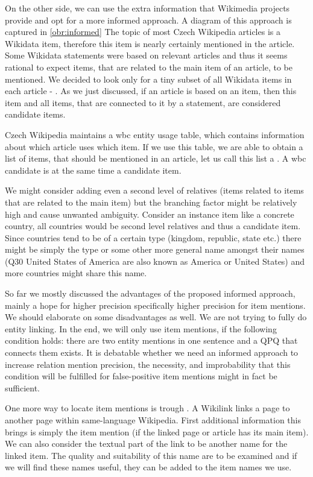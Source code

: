 On the other side, we can use the extra information that Wikimedia projects provide and opt for a more informed approach. A diagram of this approach is captured in \ref{obr:informed} The topic of most Czech Wikipedia articles is a Wikidata item, therefore this item is nearly certainly mentioned in the article. Some Wikidata statements were based on relevant articles and thus it seems rational to expect items, that are related to the main item of an article, to be mentioned. We decided to look only for a tiny subset of all Wikidata items in each article - . As we just discussed, if an article is based on an item, then this item and all items, that are connected to it by a statement, are considered candidate items.

Czech Wikipedia maintains a wbc entity usage table, which contains information about which article uses which item. If we use this table, we are able to obtain a list of items, that should be mentioned in an article, let us call this list a . A wbc candidate is at the same time a candidate item.

We might consider adding even a second level of relatives (items related to items that are related to the main item) but the branching factor might be relatively high and cause unwanted ambiguity. Consider an instance item like a concrete country, all countries would be second level relatives and thus a candidate item. Since countries tend to be of a certain type (kingdom, republic, state etc.) there might be simply the type or some other more general name amongst their names (Q30 United States of America are also known as America or United States) and more countries might share this name.

So far we mostly discussed the advantages of the proposed informed approach, mainly a hope for higher precision specifically higher precision for item mentions. We should elaborate on some disadvantages as well. We are not trying to fully do entity linking. In the end, we will only use item mentions, if the following condition holds: there are two entity mentions in one sentence and a QPQ that connects them exists. It is debatable whether we need an informed approach to increase relation mention precision, the necessity, and improbability that this condition will be fulfilled for false-positive item mentions might in fact be sufficient.

One more way to locate item mentions is trough . A Wikilink links a page to another page within same-language Wikipedia. First additional information this brings is simply the item mention (if the linked page or article has its main item). We can also consider the textual part of the link to be another name for the linked item. The quality and suitability of this name are to be examined and if we will find these names useful, they can be added to the item names we use.



